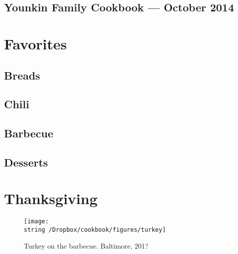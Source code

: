 \documentclass[12pt, final]{book}
\begin{document}
\frontmatter

\cleardoublepage
\section*{Younkin Family Cookbook --- October 2014}

\tableofcontents
\mainmatter

\chapter{Favorites}\label{chapter1}

\newpage

\newpage

\newpage

\newpage

\newpage

\newpage
\section{Breads}

\newpage

\newpage

\newpage
\section{Chili}

\newpage

\newpage

\newpage
\section{Barbecue}

\newpage

\newpage
\section{Desserts}

\newpage

\newpage

\newpage

\clearpage
\chapter{Thanksgiving}\label{chapter2}
\begin{figure}[h]
\begin{center}
\texttt{[image: \\string~/Dropbox/cookbook/figures/turkey]}
\end{center}
\caption*{Turkey on the barbecue. Baltimore, 201?}
\end{figure}
\newpage


\newpage

\newpage

\newpage

\newpage

\newpage

\newpage

\newpage
\end{document}
